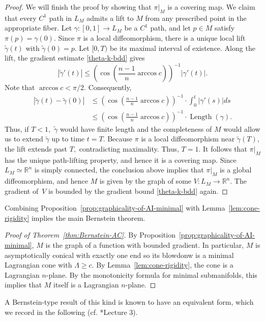 \documentclass[11pt]{amsart}
\numberwithin{equation}{section}
\theoremstyle{definition}
\theoremstyle{definition}
\newcommand{\pr}[1]{\left(#1\right)}
\newcommand{\bb}[1]{\mathbb{#1}} \newcommand{\td}[1]{\widetilde{#1}}
\begin{document}
\begin{proof}
    
    We will finish the proof by showing that $\pi|_M$ is a covering map.
    We claim that every $C^1$ path in $L_M$ admits a lift to $M$ from any prescribed point in the appropriate fiber. 
    Let $\gamma\colon[0,1]\to L_M$ be a $C^1$ path, and let $p\in M$ satisfy $\pi(p)=\gamma(0).$ 
    Since $\pi$ is a local diffeomorphism, there is a unique local lift
    $\td\gamma(t)$ with $\td\gamma(0)=p.$ 
    Let $[0,T)$ be its maximal interval of existence.
    Along the lift, the gradient estimate \eqref{theta-k-bdd} gives
    $$|\td\gamma'(t)|\le \pr{\cos\pr{\frac{n-1}n\arccos c}}^{-1} |\gamma'(t)|.$$
    Note that $\arccos c<\pi/ 2.$
    Consequently,
    \begin{align*}
    |\td\gamma(t)-\td\gamma(0)|
    &\le \pr{\cos\pr{\frac{n-1}n\arccos c}}^{-1} \cdot \int_0^t|\gamma'(s)|ds\\
    &\le \pr{\cos\pr{\frac{n-1}n\arccos c}}^{-1} \cdot \operatorname{Length}(\gamma).
    \end{align*}
    Thus, if $T<1,$ $\td\gamma$ would have finite length and the completeness of $M$ would allow us to extend $\td\gamma$ up to time $t=T.$
    Because $\pi$ is a local diffeomorphism near $\td\gamma(T),$ the lift extends past $T,$ contradicting maximality. 
    Thus, $T=1.$
    It follows that $\pi|_M$ has the unique path-lifting property, and hence it is a covering map.
    Since $L_M\simeq \bb R^n$ is simply connected, the conclusion above implies that $\pi|_M$ is a global diffeomorphism, and hence $M$ is given by the graph of some $V\colon L_M\to\bb R^n.$
    The gradient of~$V$ is bounded by the gradient bound \eqref{theta-k-bdd} again.
\end{proof}

Combining Proposition~\ref{prop:graphicality-of-AI-minimal} with Lemma~\ref{lem:cone-rigidity} implies the main Bernstein theorem.

\begin{proof}
	[Proof of Theorem~\ref{thm:Bernstein-AC}]
	By Proposition~\ref{prop:graphicality-of-AI-minimal}, $M$ is the graph of a function with bounded gradient.
    In particular, $M$ is asymptotically conical with exactly one end so its blowdonw is a minimal Lagrangian cone with $\Lambda\ge c.$
	By Lemma~\ref{lem:cone-rigidity}, the cone is a Lagrangian $n$-plane.
	By the monotonicity formula for minimal submanifolds, this implies that $M$ itself is a Lagrangian $n$-plane.
\end{proof}

A Bernstein-type result of this kind is known to have an equivalent form, which we record in the following (cf. \cite{W16}*{Lecture 3}).
\end{document}
